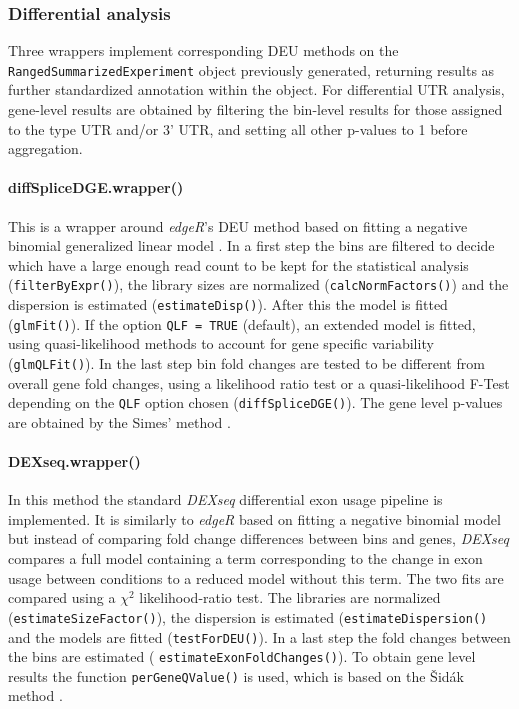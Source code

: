 \documentclass{bmcart}
\begin{document}
\subsubsection{Differential analysis}
\label{sec:DE}
Three wrappers implement corresponding DEU methods on the \linebreak \texttt{RangedSummarizedExperiment} object previously generated, returning results as further standardized annotation within the object. For differential UTR analysis, gene-level results are obtained by filtering the bin-level results for those assigned to the type UTR and/or 3' UTR, and setting all other p-values to 1 before aggregation.

\paragraph{diffSpliceDGE.wrapper()}

This is a wrapper around \textit{edgeR}'s DEU method based on fitting a negative binomial generalized linear model \cite{Robinson2009EdgeR:Data}. In a first step the bins are filtered to decide which have a large enough read count to be kept for the statistical analysis (\texttt{filterByExpr()}), the library sizes are normalized (\texttt{calcNormFactors()}) and the dispersion is estimated (\texttt{estimateDisp()}). After this the model is fitted (\texttt{glmFit()}). If the option \texttt{QLF = TRUE} (default), an extended model is fitted, using quasi-likelihood methods to account for gene specific variability (\texttt{glmQLFit()}). In the last step bin fold changes are tested to be different from overall gene fold changes, using a likelihood ratio test or a quasi-likelihood F-Test depending on the \texttt{QLF} option chosen (\texttt{diffSpliceDGE()}).  The gene level p-values are obtained by the Simes' method \cite{Simes1986AnSignificance}. 
\paragraph{DEXseq.wrapper()}

In this method the standard \textit{DEXseq} differential exon usage pipeline \cite{Anders2012DetectingData} is implemented. It is similarly to \textit{edgeR} based on fitting a negative binomial model but instead of comparing fold change differences between bins and genes, \textit{DEXseq} compares a full model containing a term corresponding to the change in exon usage between conditions to a reduced model without this term. The two fits are compared using a $\chi^2$ likelihood-ratio test. The libraries are normalized (\texttt{estimateSizeFactor()}), the dispersion is estimated (\texttt{estimateDispersion()} and the models are fitted (\texttt{testForDEU()}). In a last step the fold changes between the bins are estimated ( \texttt{estimateExonFoldChanges()}). To obtain gene level results the function \texttt{perGeneQValue()} is used, which is based on the Šidák method \cite{Sidak1967RectangularDistributions}.
\end{document}
